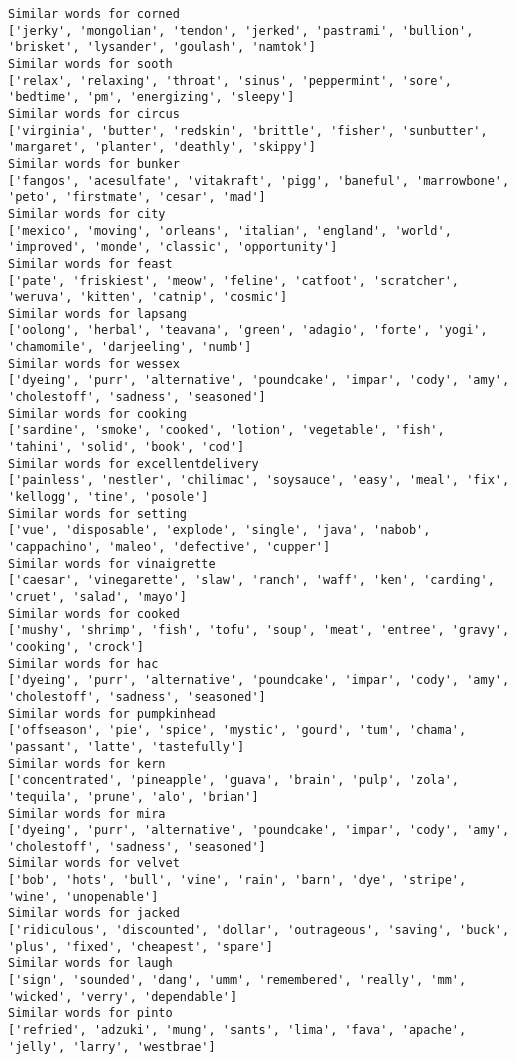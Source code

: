 \documentclass[11pt]{article}
\begin{document}
\begin{Verbatim}[commandchars=\\\{\}]
Similar words for corned
['jerky', 'mongolian', 'tendon', 'jerked', 'pastrami', 'bullion', 'brisket', 'lysander', 'goulash', 'namtok']
Similar words for sooth
['relax', 'relaxing', 'throat', 'sinus', 'peppermint', 'sore', 'bedtime', 'pm', 'energizing', 'sleepy']
Similar words for circus
['virginia', 'butter', 'redskin', 'brittle', 'fisher', 'sunbutter', 'margaret', 'planter', 'deathly', 'skippy']
Similar words for bunker
['fangos', 'acesulfate', 'vitakraft', 'pigg', 'baneful', 'marrowbone', 'peto', 'firstmate', 'cesar', 'mad']
Similar words for city
['mexico', 'moving', 'orleans', 'italian', 'england', 'world', 'improved', 'monde', 'classic', 'opportunity']
Similar words for feast
['pate', 'friskiest', 'meow', 'feline', 'catfoot', 'scratcher', 'weruva', 'kitten', 'catnip', 'cosmic']
Similar words for lapsang
['oolong', 'herbal', 'teavana', 'green', 'adagio', 'forte', 'yogi', 'chamomile', 'darjeeling', 'numb']
Similar words for wessex
['dyeing', 'purr', 'alternative', 'poundcake', 'impar', 'cody', 'amy', 'cholestoff', 'sadness', 'seasoned']
Similar words for cooking
['sardine', 'smoke', 'cooked', 'lotion', 'vegetable', 'fish', 'tahini', 'solid', 'book', 'cod']
Similar words for excellentdelivery
['painless', 'nestler', 'chilimac', 'soysauce', 'easy', 'meal', 'fix', 'kellogg', 'tine', 'posole']
Similar words for setting
['vue', 'disposable', 'explode', 'single', 'java', 'nabob', 'cappachino', 'maleo', 'defective', 'cupper']
Similar words for vinaigrette
['caesar', 'vinegarette', 'slaw', 'ranch', 'waff', 'ken', 'carding', 'cruet', 'salad', 'mayo']
Similar words for cooked
['mushy', 'shrimp', 'fish', 'tofu', 'soup', 'meat', 'entree', 'gravy', 'cooking', 'crock']
Similar words for hac
['dyeing', 'purr', 'alternative', 'poundcake', 'impar', 'cody', 'amy', 'cholestoff', 'sadness', 'seasoned']
Similar words for pumpkinhead
['offseason', 'pie', 'spice', 'mystic', 'gourd', 'tum', 'chama', 'passant', 'latte', 'tastefully']
Similar words for kern
['concentrated', 'pineapple', 'guava', 'brain', 'pulp', 'zola', 'tequila', 'prune', 'alo', 'brian']
Similar words for mira
['dyeing', 'purr', 'alternative', 'poundcake', 'impar', 'cody', 'amy', 'cholestoff', 'sadness', 'seasoned']
Similar words for velvet
['bob', 'hots', 'bull', 'vine', 'rain', 'barn', 'dye', 'stripe', 'wine', 'unopenable']
Similar words for jacked
['ridiculous', 'discounted', 'dollar', 'outrageous', 'saving', 'buck', 'plus', 'fixed', 'cheapest', 'spare']
Similar words for laugh
['sign', 'sounded', 'dang', 'umm', 'remembered', 'really', 'mm', 'wicked', 'verry', 'dependable']
Similar words for pinto
['refried', 'adzuki', 'mung', 'sants', 'lima', 'fava', 'apache', 'jelly', 'larry', 'westbrae']

\end{Verbatim}
\end{document}
